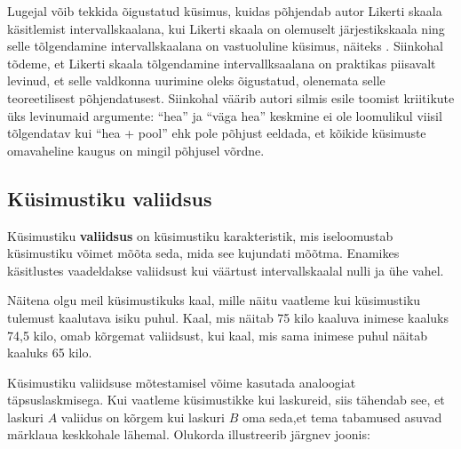 \documentclass[a4paper,12pt,oneside]{article}
\numberwithin{equation}{section}
\theoremstyle{definition}
\begin{document}
Lugejal võib tekkida õigustatud k\"usimus, kuidas põhjendab autor Likerti skaala käsitlemist intervallskaalana, kui Likerti skaala on olemuselt järjestikskaala ning selle tõlgendamine intervallskaalana on vastuoluline küsimus, näiteks \cite{Jamieson2004}. Siinkohal tõdeme, et Likerti skaala tõlgendamine intervallksaalana on praktikas piisavalt levinud, et selle valdkonna uurimine oleks õigustatud, olenemata selle teoreetilisest põhjendatusest.  Siinkohal väärib autori silmis esile toomist kriitikute \"uks levinumaid argumente: "`hea"' ja "`väga hea"'  keskmine ei ole  loomulikul viisil tõlgendatav kui "`hea + pool"' ehk pole põhjust eeldada, et kõikide küsimuste omavaheline kaugus on mingil põhjusel võrdne. 



\subsection{Küsimustiku valiidsus}

Küsimustiku \textbf{valiidsus} on küsimustiku karakteristik, mis iseloomustab küsimustiku võimet mõõta seda, mida see kujundati mõõtma. Enamikes käsitlustes vaadeldakse valiidsust kui väärtust intervallskaalal nulli ja ühe vahel.

Näitena olgu meil küsimustikuks kaal, mille näitu vaatleme kui küsimustiku tulemust kaalutava isiku puhul. Kaal, mis näitab 75 kilo kaaluva inimese kaaluks 74,5 kilo, omab kõrgemat valiidsust, kui kaal, mis sama inimese puhul näitab kaaluks 65 kilo.   


Küsimustiku valiidsuse mõtestamisel võime kasutada analoogiat täpsuslaskmisega. Kui vaatleme küsimustikke kui laskureid, siis tähendab see, et laskuri $A$ valiidus on kõrgem kui laskuri $B$ oma seda,et tema tabamused asuvad märklaua keskkohale lähemal. Olukorda illustreerib järgnev joonis:
\end{document}
